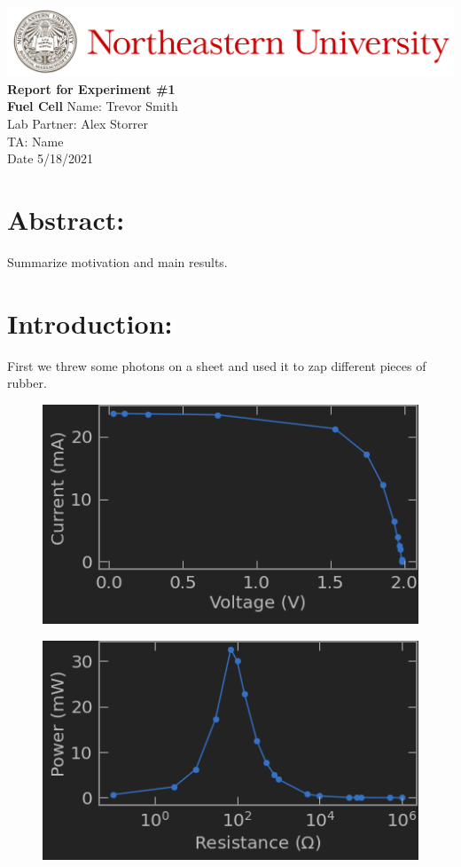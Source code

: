 \documentclass[12pt,a4paper]{article}
\begin{document}
\begin{center}
    \includegraphics[width=\textwidth]{../Images/Header.jpeg}
    \vfill
    \textbf{\Large{Report for Experiment \#1\\
    Fuel Cell}}
    \vfill
    Name: Trevor Smith\\
    Lab Partner: Alex Storrer\\
    TA: Name\\
    Date 5/18/2021
    \vfill
\end{center}

\section*{Abstract:}
	Summarize motivation and main results.

\newpage

\section*{Introduction:}
First we threw some photons on a sheet and used it to zap different pieces of rubber.

\begin{figure}[h]
	\centering
	\includegraphics[width=6in]{l1_a_1.png}
\end{figure}

\begin{figure}[h]
	\centering
	\includegraphics[width=6in]{l1_a_2.png}
\end{figure}
\end{document}
